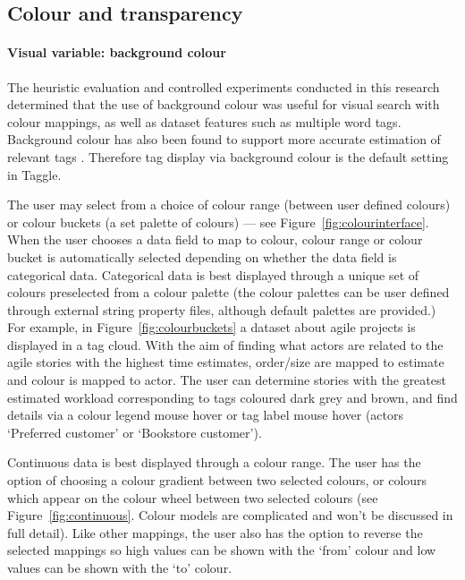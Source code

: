 \subsection{Colour and transparency} \label{colourmappings}

\paragraph{Visual variable: background colour} The heuristic evaluation and controlled experiments conducted in this research determined that the use of background colour was useful for visual search with colour mappings, as well as dataset features such as multiple word tags. Background colour has also been found to support more accurate estimation of relevant tags \citep{waldner13}. Therefore tag display via background colour is the default setting in Taggle. 

The user may select from a choice of colour range (between user defined colours) or colour buckets (a set palette of colours) --- see Figure~\vref{fig:colourinterface}. When the user chooses a data field to map to colour, colour range or colour bucket is automatically selected depending on whether the data field is categorical data. Categorical data is best displayed through a unique set of colours preselected from a colour palette (the colour palettes can be user defined through external string property files, although default palettes are provided.) For example, in Figure~\vref{fig:colourbuckets} a dataset about agile projects is displayed in a tag cloud. With the aim of finding what actors are related to the agile stories with the highest time estimates, order/size are mapped to estimate and colour is mapped to actor. The user can determine stories with the greatest estimated workload corresponding to tags coloured dark grey and brown, and find details via a colour legend mouse hover or tag label mouse hover (actors `Preferred customer' or `Bookstore customer').

Continuous data is best displayed through a colour range. The user has the option of choosing a colour gradient between two selected colours, or colours which appear on the colour wheel between two selected colours (see Figure~\vref{fig:continuous}. Colour models are complicated and won't be discussed in full detail). Like other mappings, the user also has the option to reverse the selected mappings so high values can be shown with the `from' colour and low values can be shown with the `to' colour.

